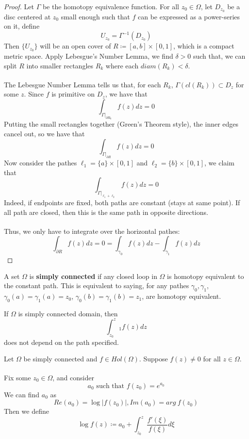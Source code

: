 \documentclass{article}
\begin{document}
\begin{proof}
Let $\Gamma$ be the homotopy equivalence function. For all $z_0 \in \Omega$, let $D_{z_0}$ be a disc centered at $z_0$ small enough such that $f$ can be expressed as a power-series on it, define
\[U_{z_0} = \Gamma^{-1}(D_{z_0})\]
Then $\{U_{z_0}\}$ will be an open cover of $R \coloneqq [a, b] \times [0, 1]$, which is a compact metric space. Apply Lebesgue's Number Lemma, we find $\delta > 0$ such that, we can split $R$ into smaller rectangles $R_k$ where each $diam(R_k) < \delta$.\\\\
The Lebesgue Number Lemma tells us that, for each $R_k$, $\Gamma(cl(R_k)) \subset D_{z}$ for some $z$. Since $f$ is primitive on $D_z$, we have that
\[\int_{\Gamma|_{\partial R_k}} f(z) dz = 0\]
Putting the small rectangles together (Green's Theorem style), the inner edges cancel out, so we have that
\[\int_{\Gamma|_{\partial R}} f(z) dz = 0\]
Now consider the pathes $\ell_1 = \{a\} \times [0, 1]$ and $\ell_2 = \{b\} \times [0, 1]$, we claim that
\[\int_{\Gamma|_{\ell_1 + \ell_2}} f(z) dz = 0\]
Indeed, if endpoints are fixed, both paths are constant (stays at same point). If all path are closed, then this is the same path in opposite directions.\\\\
Thus, we only have to integrate over the horizontal pathes:
\[\int_{\partial R} f(z) dz = 0 = \int_{\gamma_0} f(z) dz - \int_{\gamma_1} f(z) dz\]
\end{proof}

\begin{definition}
    A set $\Omega$ is \textbf{simply connected} if any closed loop in $\Omega$ is homotopy equivalent to the constant path. This is equivalent to saying, for any pathes $\gamma_0, \gamma_1$, $\gamma_0(a) = \gamma_1(a) = z_0$, $\gamma_0(b) = \gamma_1(b) = z_1$, are homotopy equivalent.
\end{definition}

\begin{remark}
If $\Omega$ is simply connected domain, then
\[\int_{z_0}^z_1 f(z) dz\]
does not depend on the path specified.
\end{remark}

\begin{definition}
    Let $\Omega$ be simply connected and $f \in Hol(\Omega)$. Suppose $f(z) \neq 0$ for all $z \in \Omega$.\\\\
    Fix some $z_0 \in \Omega$, and consider
    \[a_0 \text{ such that } f(z_0) = e^{a_0}\]
    We can find $a_0$ as
    \[Re(a_0) = \log |f(z_0)|, Im(a_0) = arg\ f(z_0)\]
    Then we define
    \[\log f(z) \coloneqq a_0 + \int_{z_0}^z \frac{f'(\xi)}{f(\xi)} d\xi\]
\end{definition}
\end{document}
